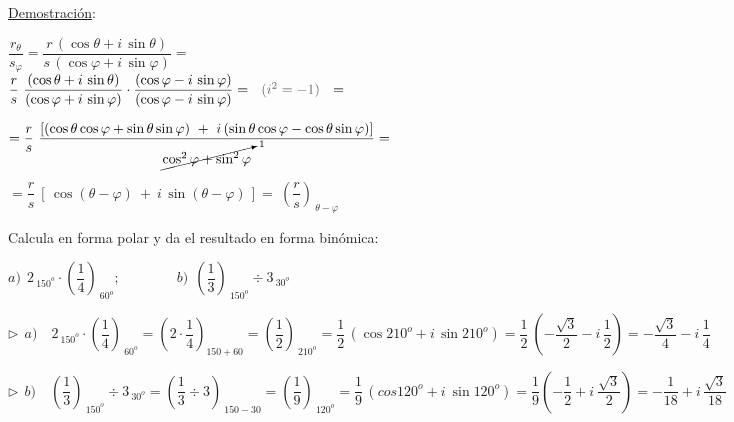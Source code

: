 \underline{Demostración}:

$\dfrac{ r_\theta }{ s_\varphi} = \dfrac{r\, (\cos \theta+i\, \sin \theta)} {s\, (\cos \varphi+i\, \sin \varphi)}=$
$\dfrac r s \ \dfrac{ (\cos \theta+i\, \sin \theta)}{ (\cos \varphi+i\, \sin \varphi)} \cdot \dfrac { (\cos \varphi-i\, \sin \varphi)}{ (\cos \varphi-i\, \sin \varphi)} = \ \textcolor{gris}{\ (i^2=-1)\ } \ =$

$=\dfrac r s \ \dfrac{\left[ (\cos \theta \cos \varphi + \sin \theta \sin \varphi) \ + \ i\, (\sin \theta \cos \varphi - \cos \theta \sin \varphi) \right]}{\cancelto{1}{\cos^2 \varphi + \sin^2 \varphi}} = $

$= \dfrac r s \ \left[ \, \cos (\theta-\varphi) \ + \ i\, \sin (\theta-\varphi)  \, \right] = \ \left( \dfrac r s \right)_{\ \theta-\varphi} $ \QED



\begin{miejemplo}

Calcula en forma polar y da el resultado en forma binómica: 

$a)\ \  2_{\ 150^o} \cdot \left( \dfrac 1 4 \right)_{\ 60^o}; \qquad  \qquad b)\ \ \left( \dfrac 1 3 \right)_{\ 150^o} \div 3_{\ 30^o}$

\vspace{4mm} $\triangleright \ \ a) \quad  2_{\ 150^o} \cdot \left( \dfrac 1 4 \right)_{\ 60^o} =\left( 2\cdot \dfrac 1 4 \right)_{150+60}= \left( \dfrac 1 2 \right)_{\ 210^o}= \dfrac 1 2 \, ( \cos 210^o + i\, \sin 210^o)=\dfrac 1 2 \ \left( -\dfrac{\sqrt{3}}{2} - i\, \dfrac 1 2   \right) =-\dfrac{\sqrt{3}}{4}-i\, \dfrac 1 4$

\vspace{4mm} $\triangleright \ \ b) \quad \left( \dfrac 1 3 \right)_{\ 150^o} \div 3_{\ 30^o} = \left( \dfrac 1 3 \div 3 \right)_{\ 150-30}=\left( \dfrac 1 9 \right)_{\ 120^o}=\dfrac 1 9 \, (cos 120^o+i\ \sin 120^o)=\dfrac 1 9 \left(-\dfrac 1 2 + i\ \dfrac{\sqrt{3}}{2} \right)= -\dfrac 1{18} + i\, \dfrac{\sqrt{3}}{18}$
	
\end{miejemplo}

